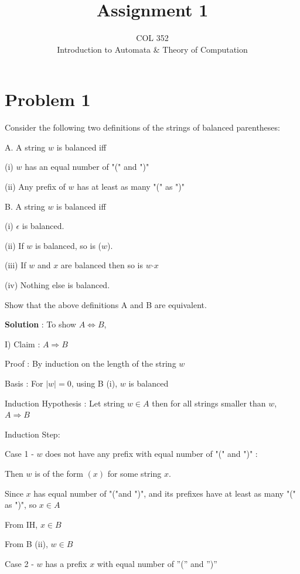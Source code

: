 \documentclass{article}
\title{Assignment 1}
\author{COL 352\\
    Introduction to Automata \& 
    Theory of Computation}
\date{}
\begin{document}
    \maketitle
    
    \section*{Problem 1} Consider the following two definitions of the strings of balanced parentheses:
    
    A. A string $w$ is balanced iff
    
    \quad (i) $w$ has an equal number of "(" and ")"
    
    \quad (ii) Any prefix of $w$ has at least as many "(" as ")"
    
    B. A string $w$ is balanced iff
    
    \quad (i) $\epsilon $ is balanced.
    
    \quad (ii) If $w$ is balanced, so is ($w$).
    
    \quad (iii) If $w$ and $x$ are balanced then so is $w\textrm{·}x$
    
    \quad (iv) Nothing else is balanced.
    
    Show that the above definitions A and B are equivalent.
    
    
    \textbf{Solution} : To show $A \iff B$,
    
    I) Claim : $A \Longrightarrow B$
    
    Proof : By induction on the length of the string $w$
    
    Basis : For $|w| = 0$, using B (i), $w$ is balanced
    
    Induction Hypothesis : Let string $w \in A$ then for all strings smaller than $w$, $A \Longrightarrow B$
    
    Induction Step:
    
    \quad Case 1 - $w$ does not have any prefix with equal number of "(" and ")" : 
    
    \qquad Then $w$ is of the form $( x )$ for some string $x$. 
    
    \qquad Since $x$ has equal number of "("and ")", and its prefixes have at least as many "(" as ")", so $x \in A$
    
    \qquad From IH,  $x \in B$
    
    \qquad From B (ii),  $w \in B$
    
    
    
    \quad Case 2 - $w$ has a prefix $x$ with equal number of ”(” and ”)”
    
\end{document}
